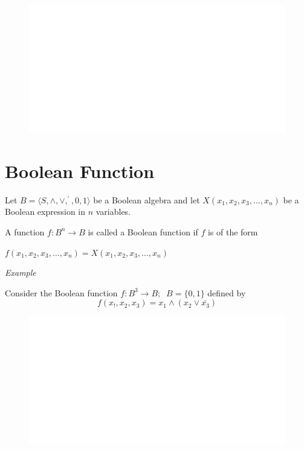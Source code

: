 \documentclass[]{book}
\begin{document}
\begin{figure}

{\centering \includegraphics[width=1\linewidth]{figure/boxC413-1} 

}

\end{figure}

\hypertarget{boolean-function}{%
\section{Boolean Function}\label{boolean-function}}

Let \(B = \langle S, \land, \lor, ^\prime, 0,1\rangle\) be a Boolean algebra and let \(X(x_1, x_2,x_3, \dots, x_n)\) be a Boolean expression in \(n\) variables.

A function \(f: B^n \rightarrow B\) is called a Boolean function if \(f\) is of the form

\(f(x_1, x_2,x_3, \dots, x_n) = X(x_1, x_2,x_3, \dots, x_n)\)

\emph{Example}

Consider the Boolean function \(f: B^3 \rightarrow B; \;\; B = \{0,1\}\) defined by
\[f(x_!,x_2,x_3) = x_1 \land (x_2 \lor \bar{x_3})\]

\begin{figure}

{\centering \includegraphics[width=1\linewidth]{figure/boxC414-1} 

}

\end{figure}
\end{document}
